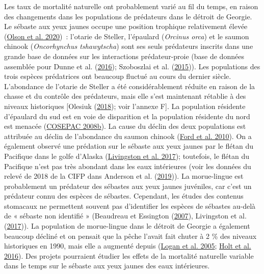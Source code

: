 \documentclass[french,11pt]{book}
\begin{document}
Les taux de mortalité naturelle ont probablement varié au fil du temps, en raison des changements dans les populations de prédateurs dans le détroit de Georgie. Le sébaste aux yeux jaunes occupe une position trophique relativement élevée (\protect\hyperlink{ref-olson2020}{Olson et al. 2020})~: l'otarie de Steller, l'épaulard (\emph{Orcinus orca}) et le saumon chinook (\emph{Oncorhynchus tshawytscha}) sont ses seuls prédateurs inscrits dans une grande base de données sur les interactions prédateur-proie (base de données assemblée pour Dunne et al. (\protect\hyperlink{ref-dunne2016}{2016}); Szoboszlai et al. (\protect\hyperlink{ref-szoboszlai2015}{2015})). Les populations des trois espèces prédatrices ont beaucoup fluctué au cours du dernier siècle. L'abondance de l'otarie de Steller a été considérablement réduite en raison de la chasse et du contrôle des prédateurs, mais elle s'est maintenant rétablie à des niveaux historiques {[}Olesiuk (\protect\hyperlink{ref-olesiuk2018}{2018}); voir l'annexe F{]}. La population résidente d'épaulard du sud est en voie de disparition et la population résidente du nord est menacée (\protect\hyperlink{ref-cosewic2008b}{COSEPAC 2008b}). La cause du déclin des deux populations est attribuée au déclin de l'abondance du saumon chinook (\protect\hyperlink{ref-ford2010}{Ford et al. 2010}). On a également observé une prédation sur le sébaste aux yeux jaunes par le flétan du Pacifique dans le golfe d'Alaska (\protect\hyperlink{ref-livingston2017}{Livingston et al. 2017}); toutefois, le flétan du Pacifique n'est pas très abondant dans les eaux intérieures (voir les données du relevé de 2018 de la CIFP dans Anderson et al. (\protect\hyperlink{ref-anderson2019synopsis}{2019})). La morue-lingue est probablement un prédateur des sébastes aux yeux jaunes juvéniles, car c'est un prédateur connu des espèces de sébastes. Cependant, les études des contenus stomacaux ne permettent souvent pas d'identifier les espèces de sébastes au-delà de « sébaste non identifié » (Beaudreau et Essington (\protect\hyperlink{ref-beaudreau2007}{2007}), Livingston et al. (\protect\hyperlink{ref-livingston2017}{2017})). La population de morue-lingue dans le détroit de Georgie a également beaucoup décliné et on pensait que la pêche l'avait fait chuter à 2 \% des niveaux historiques en 1990, mais elle a augmenté depuis (\protect\hyperlink{ref-logan2005}{Logan et al. 2005}; \protect\hyperlink{ref-holt2016}{Holt et al. 2016}). Des projets pourraient étudier les effets de la mortalité naturelle variable dans le temps sur le sébaste aux yeux jaunes des eaux intérieures.
\end{document}
